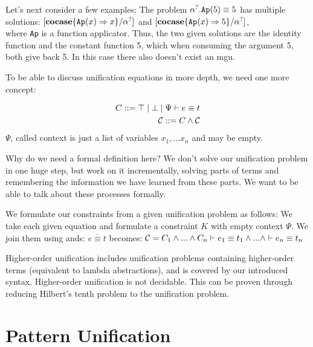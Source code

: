 \documentclass[twoside,12pt,a4paper]{article}
\begin{document}
Let's next consider a few examples:
The problem $\alpha^?.\texttt{Ap}(5) \equiv 5$ has multiple solutions:
$[\textbf{cocase}\{\texttt{Ap}(x)\Rightarrow x\} / \alpha^?]$ and $[\textbf{cocase}\{\texttt{Ap}(x)\Rightarrow 5\} / \alpha^?]$,\\
where \texttt{Ap} is a function applicator. 
Thus, the two given solutions are the identity function and the constant function 5, which when consuming the argument 5, both give back 5.
In this case there also doesn't exist an mgu.


To be able to discuss unification equations in more depth, we need one more concept:

\begin{definition}[Constraint]
    \begin{align*}
        C ::= \top \;|\; \bot \;|\; \Psi \vdash e\equiv t\\
        \mathcal{C} ::= C \wedge \mathcal{C}
    \end{align*}
    $\Psi$, called context is just a list of variables $x_1,...x_n$ and may be empty.
\end{definition}
Why do we need a formal definition here? We don't solve our unification problem in one huge step, but
work on it incrementally, solving parts of terms and remembering the information we have learned from these parts.
We want to be able to talk about these processes formally.

We formulate our constraints from a given unification problem as follows:
We take each given equation and formulate a constraint $K$ with empty context $\Psi$. We join them using ands: %
$\overline{e\equiv t}$ becomes: $\mathcal{C} = C_1 \wedge ... \wedge C_n  \vdash e_1 \equiv t_1 \wedge ...\wedge \vdash e_n \equiv t_n $  


\begin{theorem}
    Higher-order unification includes unification problems containing higher-order terms (equivalent to lambda abstractions),
    and is covered by our introduced syntax. %
    Higher-order unification is not decidable. This can be proven through reducing Hilbert's tenth problem to the unification problem.
\end{theorem}


\section{Pattern Unification}
\end{document}
